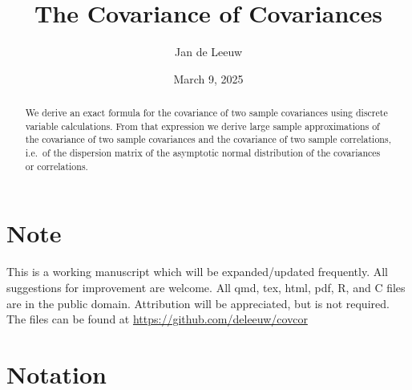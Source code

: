 \documentclass[
  12pt,
  letterpaper,
  DIV=11,
  numbers=noendperiod]{scrartcl}
\title{The Covariance of Covariances}
\author{Jan de Leeuw}
\date{March 9, 2025}
\newcommand{\sectionbreak}{\clearpage}
\renewcommand*\contentsname{Table of contents}
\newcommand\contentsname{Table of contents}
\begin{document}
\maketitle
\begin{abstract}
We derive an exact formula for the covariance of two sample covariances
using discrete variable calculations. From that expression we derive
large sample approximations of the covariance of two sample covariances
and the covariance of two sample correlations, i.e.~of the dispersion
matrix of the asymptotic normal distribution of the covariances or
correlations.
\end{abstract}

\renewcommand*\contentsname{Table of contents}
{
\hypersetup{linkcolor=}
\setcounter{tocdepth}{3}
\tableofcontents
}

\sectionbreak

\section*{Note}\label{note}

This is a working manuscript which will be expanded/updated frequently.
All suggestions for improvement are welcome. All qmd, tex, html, pdf, R,
and C files are in the public domain. Attribution will be appreciated,
but is not required. The files can be found at
\url{https://github.com/deleeuw/covcor}

\section*{Notation}\label{notation}
\end{document}
